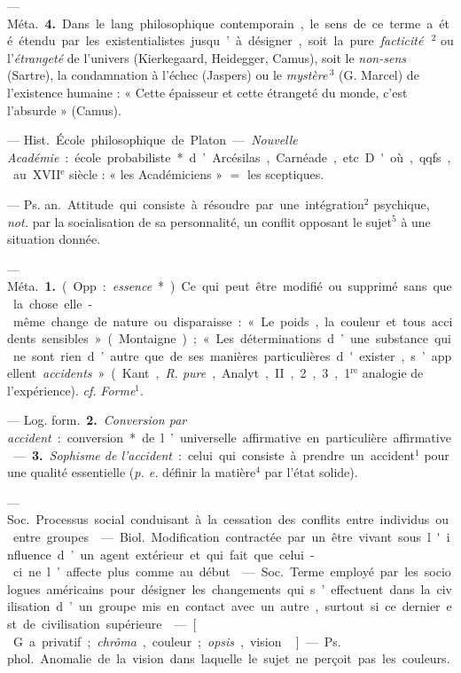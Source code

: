 \begin{itemize}[leftmargin=1cm, label=, itemsep=1pt]
— \si{Méta.} {\bf 4.} Dans le lang. philosophique contemporain, le sens de
ce terme a été étendu par les existentialistes jusqu’à désigner, soit la
pure {\it facticité}\,$^2$ ou l'{\it étrangeté} de l'univers (Kierkegaard, Heidegger, Camus),
soit le {\it non-sens} (Sartre), la
condamnation à l'échec (Jaspers) ou
le {\it mystère}\,$^3$ (G. Marcel) de l'existence
humaine : « Cette épaisseur et cette
étrangeté du monde, c’est l'absurde »
(Camus).

 — \si{Hist.} École philosophique de Platon.
— {\it Nouvelle Académie} :
école probabiliste* d’Arcésilas, Carnéade, etc. D'où, qqfs., au
{\footnotesize XVII}$^\text{e}$ siècle : « les Académiciens »
$=$ les sceptiques.

 — \si{Ps. an.} Attitude qui
consiste à résoudre par une intégration$^2$ psychique, {\it not.} par la socialisation
de sa personnalité, un conflit
opposant le sujet$^5$ à une situation
donnée.

 — \si{Méta.} {\bf 1.} (Opp. : {\it essence}*).
Ce qui peut être modifié ou supprimé sans que la chose elle-même
change de nature ou disparaisse :
« Le poids, la couleur et tous accidents sensibles » (Montaigne); « Les
déterminations d’une substance qui
ne sont rien d’autre que de ses manières particulières d'exister,
s’appellent {\it accidents} » (Kant, {\it R. pure},
Analyt., II, 2, 3, 1$^\text{re}$ analogie de l’expérience). {\it cf.}  {\it Forme}$^1$.

— \si{Log. form.} {\bf 2.} {\it Conversion par
accident} : conversion* de l’universelle affirmative en particulière
affirmative. — {\bf 3.} {\it Sophisme de l’accident} : celui qui consiste à prendre
un accident$^1$ pour une qualité essentielle ({\it p. e.} définir la matière$^4$ par
l’état solide).

 — \si{Soc.} Processus
social conduisant à la cessation des
conflits entre individus ou entre
groupes.

 — \si{Biol.} Modification
contractée par un être vivant sous
l'influence d’un agent extérieur et
qui fait que celui-ci ne l’affecte plus
comme au début.

 — \si{Soc.} Terme employé
par les sociologues américains pour
désigner les changements qui s’effectuent dans la civilisation d’un groupe
mis en contact avec un autre, surtout si ce dernier est de civilisation
supérieure.

 — [\,G. a privatif; {\it chrôma},
couleur; {\it opsis}, vision\,] — \si{Ps. phol.}
Anomalie de la vision dans laquelle
le sujet ne perçoit pas les couleurs.


\end{itemize}
